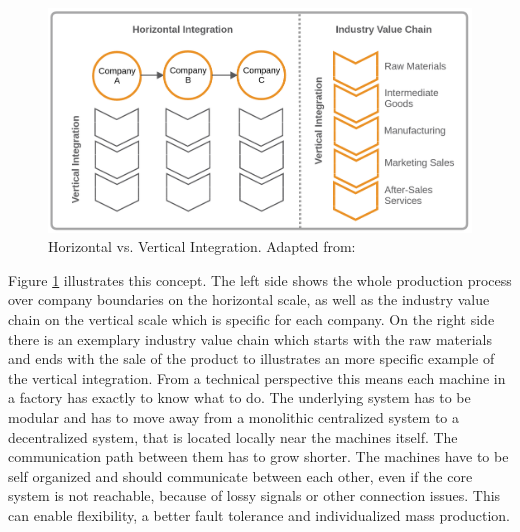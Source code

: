 \begin{figure}[H]
    \centering
    \includegraphics[width=\textwidth]{resources/images/vertical_horizontal_integration.png}
    \caption[Horizontal vs. Vertical Integration]{Horizontal vs. Vertical Integration. Adapted from: \autocite{Jur:2013}}
    \label{fig:vertical_horizontal_integration}
\end{figure}

Figure \ref{fig:vertical_horizontal_integration} illustrates this concept.
The left side shows the whole production process over company boundaries on the horizontal scale, as well as the industry value chain on the vertical scale which is specific for each company.
On the right side there is an exemplary industry value chain which starts with the raw materials and ends with the sale of the product to illustrates an more specific example of the vertical integration.
From a technical perspective this means each machine in a factory has exactly to know what to do.
The underlying system has to be modular and has to move away from a monolithic centralized system to a decentralized system, that is located locally near the machines itself.
The communication path between them has to grow shorter.
The machines have to be self organized and should communicate between each other, even if the core system is not reachable, because of lossy signals or other connection issues.
This can enable flexibility, a better fault tolerance and individualized mass production.\autocite[cf.]{Lyd:2016}


